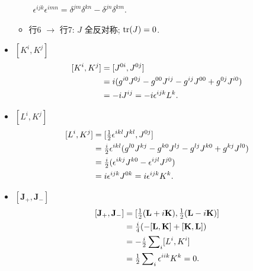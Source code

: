 \begin{itemize}
\begin{itemize}
                \quad \ $\epsilon^{ijk}\epsilon^{imn} = \delta^{jm}\delta^{kn} - \delta^{jn}\delta^{km}$.
          \item 行6 $\rightarrow$ 行7: $J$ 全反对称; ${\rm tr}(J)=0$.
        \end{itemize}
  \item $[K^i, K^j]$
        \begin{equation}
          \begin{aligned}
            \relax[K^i, K^j] & = [J^{0i}, J^{0j}]                                             \\
                             & = i(g^{i0}J^{0j} - g^{00}J^{ij} - g^{ij}J^{00} + g^{0j}J^{i0}) \\
                             & = -iJ^{ij} = -i\epsilon^{ijk}L^k.
          \end{aligned}
        \end{equation}
  \item $[L^i, K^j]$
        \begin{equation}
          \begin{aligned}
            \relax[L^i, K^j] & = [\tfrac{1}{2}\epsilon^{ikl}J^{kl}, J^{0j}]                                            \\
                             & = \tfrac{i}{2}\epsilon^{ikl}(g^{l0}J^{kj} - g^{k0}J^{lj} - g^{lj}J^{k0} + g^{kj}J^{l0}) \\
                             & = \tfrac{i}{2}(\epsilon^{ikj}J^{k0} - \epsilon^{ijl}J^{j0})                             \\
                             & = i\epsilon^{ijk}J^{0k} = i\epsilon^{ijk}K^{k}.
          \end{aligned}
        \end{equation}
  \item $[\mathbf{J}_+, \mathbf{J}_-]$
        \begin{equation}
          \begin{aligned}
            \relax[\mathbf{J}_+, \mathbf{J}_-] & = [\tfrac{1}{2}(\mathbf{L}+i\mathbf{K}), \tfrac{1}{2}(\mathbf{L}-i\mathbf{K})] \\
                                               & = \tfrac{i}{4} (-[\mathbf{L}, \mathbf{K}] + [\mathbf{K}, \mathbf{L}])          \\
                                               & = -\tfrac{i}{2} \sum\nolimits_i [L^i, K^i]                                     \\
                                               & = \tfrac{1}{2}\sum\nolimits_i\epsilon^{iik}K^k = 0.

\end{aligned}
\end{equation}
\end{itemize}
